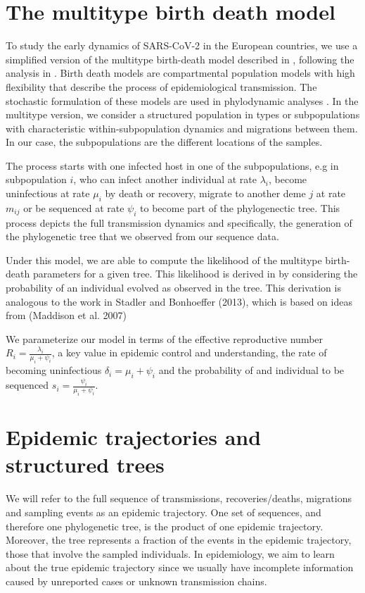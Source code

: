 \section{The multitype birth death model}

To study the early dynamics of SARS-CoV-2 in the European countries, we use a simplified version of the multitype birth-death model described in \cite{Kuhnert2016}, following the analysis in \cite{Nadeau2020}. Birth death models are compartmental population models with high flexibility that describe the process of epidemiological transmission. The stochastic formulation of these models are used in phylodynamic analyses \cite{Stadler2012}. In the multitype version, we consider a structured population in types or subpopulations with characteristic within-subpopulation dynamics and migrations between them. In our case, the subpopulations are the different locations of the samples.

The process starts with one infected host in one of the subpopulations, e.g in subpopulation $i$, who can infect another individual at rate $\lambda_i$, become uninfectious at rate $\mu_i$ by death or recovery, migrate to another deme $j$ at rate $m_{ij}$ or be sequenced at rate $\psi_i$ to become part of the phylogenectic tree. This process depicts the full transmission dynamics and specifically, the generation of the phylogenetic tree that we observed from our sequence data. 

Under this model, we are able to compute the likelihood of the multitype birth-death parameters for a given tree. This likelihood is derived in \cite{Kuhnert} by considering the probability of an individual evolved as observed in the tree. This derivation is analogous to the work in Stadler and Bonhoeffer (2013), which is based on ideas from (Maddison et al. 2007)

We parameterize our model in terms of the effective reproductive number $R_i = \frac{\lambda_i}{\mu_i + \psi_i}$, a key value in epidemic control and understanding, the rate of becoming uninfectious $\delta_i = \mu_i + \psi_i$ and the probability of and individual to be sequenced $s_i = \frac{\psi_i}{\mu_i + \psi_i}$.


\section{Epidemic trajectories and structured trees}

We will refer to the full sequence of transmissions, recoveries/deaths, migrations and sampling events as an epidemic trajectory. One set of sequences, and therefore one phylogenetic tree, is the product of one epidemic trajectory. Moreover, the tree represents a fraction of the events in the epidemic trajectory, those that involve the sampled individuals. In epidemiology, we aim to learn about the true epidemic trajectory since we usually have incomplete information caused by unreported cases or unknown transmission chains.

